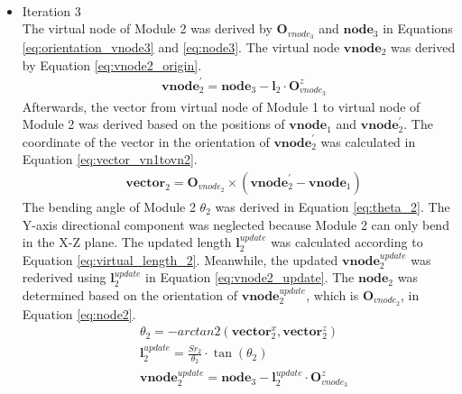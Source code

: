 \begin{itemize}
\begin{align}
    \end{align}
    \vspace{-15mm}
    \item Iteration 3 \\ %
    The virtual node of Module 2 was derived by $\textbf{O}_{vnode_3}$ and $\textbf{node}_{3}$ in Equations 
    \ref{eq:orientation_vnode3} and \ref{eq:node3}. The virtual node $\textbf{vnode}_{2}$ was derived by Equation 
    \ref{eq:vnode2_origin}.
    \vspace{-5mm}
    \begin{align}
        &\textbf{vnode}_{2}^{'} = \textbf{node}_{3} - \textbf{l}_{2} \cdot \textbf{O}_{vnode_3}^{z}
        \label{eq:vnode2_origin}
    \end{align}
    Afterwards, the vector from virtual node of Module 1 to virtual node of Module 2 was derived based on the 
    positions of $\textbf{vnode}_{1}$ and $\textbf{vnode}_{2}^{'}$. The coordinate of the vector in the orientation 
    of $\textbf{vnode}_{2}^{'}$ was calculated in Equation \ref{eq:vector_vn1tovn2}. 
    \vspace{-5mm}
    \begin{align}
        &\textbf{vector}_{2} = \textbf{O}_{vnode_2} \times (\textbf{vnode}_{2}^{'} - \textbf{vnode}_{1}) 
        \label{eq:vector_vn1tovn2} 
    \end{align}
    The bending angle of Module 2 $\theta_2$ was derived in Equation \ref{eq:theta_2}. The Y-axis directional 
    component was neglected because Module 2 can only bend in the X-Z plane. The updated length $\textbf{l}_{2}^{update}$ 
    was calculated according to Equation \ref{eq:virtual_length_2}. Meanwhile, the updated 
    $\textbf{vnode}_{2}^{update}$ was rederived using $\textbf{l}_{2}^{update}$ in Equation \ref{eq:vnode2_update}. 
    The $\textbf{node}_2$ was determined based on the orientation of $\textbf{vnode}_{2}^{update}$, 
    which is $\textbf{O}_{vnode_2}$, in Equation \ref{eq:node2}.
    \vspace{-5mm}
    \begin{align}
        &\theta_2 = -arctan2(\textbf{vector}_{2}^{x},\textbf{vector}_{2}^{z})
        \label{eq:theta_2} \\
        &\textbf{l}_{2}^{update} = \frac{Sr_2}{\theta_2}\cdot \tan(\theta_2)
        \label{eq:virtual_length_2} \\
        &\textbf{vnode}_{2}^{update} = \textbf{node}_{3} - \textbf{l}_{2}^{update} \cdot \textbf{O}_{vnode_3}^{z}
        \label{eq:vnode2_update} \\

\end{align}
\end{itemize}

